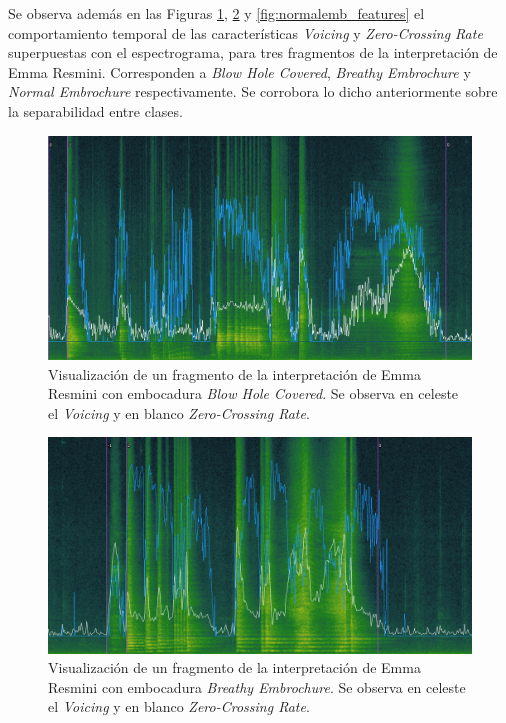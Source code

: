 \documentclass{article}
\begin{document}
\newpage


Se observa además en las Figuras \ref{fig:bhc_features}, \ref{fig:breathyemb_features} y \ref{fig:normalemb_features} el comportamiento temporal de las características \textit{Voicing} y \textit{Zero-Crossing Rate} superpuestas con el espectrograma, para tres fragmentos de la interpretación de Emma Resmini. Corresponden a \textit{Blow Hole Covered}, \textit{Breathy Embrochure} y \textit{Normal Embrochure} respectivamente. Se corrobora lo dicho anteriormente sobre la separabilidad entre clases.

\begin{figure}[H]
\begin{center}
\includegraphics[width=1\textwidth]{bhc_features} 
\caption{Visualización de un fragmento de la interpretación de Emma Resmini con embocadura \textit{Blow Hole Covered}. Se observa en celeste el \textit{Voicing} y en blanco \textit{Zero-Crossing Rate}.}
\label{fig:bhc_features}
\end{center}
\end{figure}


\begin{figure}[H]
\begin{center}
\includegraphics[width=1\textwidth]{breathyemb_features} 
\caption{Visualización de un fragmento de la interpretación de Emma Resmini con embocadura \textit{Breathy Embrochure}. Se observa en celeste el \textit{Voicing} y en blanco \textit{Zero-Crossing Rate}.}
\label{fig:breathyemb_features}
\end{center}
\end{figure}
\end{document}
